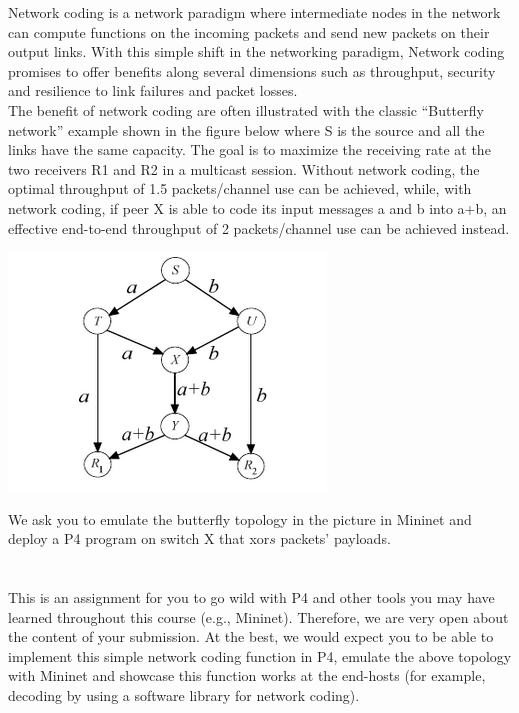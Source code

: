 Network coding is a network paradigm where intermediate nodes in the network can compute functions on the incoming packets and send new packets on their output links. With this simple shift in the networking paradigm, Network coding promises to offer benefits along several dimensions such as throughput, security and resilience to link failures and packet losses.\\
The  benefit of network coding are often illustrated with the classic “Butterfly network” example shown in the figure below where S  is  the source and all the links have the same capacity. The goal is to maximize the receiving rate at the two receivers R1 and R2  in a multicast session. Without network coding, the optimal throughput of 1.5 packets/channel use can be achieved, while, with  network  coding,  if peer X  is able  to code  its input messages a and b into a+b, an effective end-to-end throughput of 2 packets/channel use can be achieved instead.\\


\begin{center}

\includegraphics[scale=1]{./images/butterfly.png}

\end{center}

We ask you to emulate the butterfly topology in the picture in Mininet and deploy a P4 program on switch X that xor${s}$ packets' payloads.\\~\\~\\

 This is an assignment for you to go wild with P4 and other tools you may have learned throughout this course (e.g., Mininet). Therefore, we are very open about the content of your submission. At the best, we would expect you to be able to implement this simple network coding function in P4, emulate the above topology with Mininet and showcase this function works at the end-hosts (for example, decoding by using a software library for network coding).

